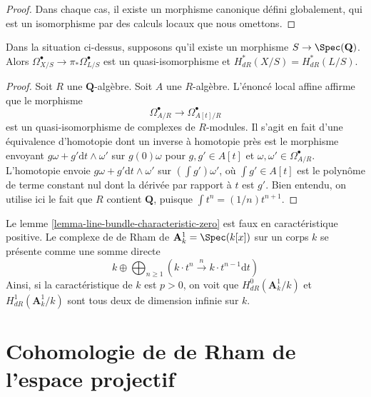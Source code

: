 \begin{proof}
Dans chaque cas, il existe un morphisme canonique défini globalement,
qui est un isomorphisme par des calculs locaux que nous omettons.
\end{proof}

\begin{lemma}
\label{lemma-line-bundle-characteristic-zero}
Dans la situation ci-dessus, supposons qu'il existe un morphisme $S \to \Spec(\mathbf{Q})$.
Alors $\Omega^\bullet_{X/S} \to \pi_*\Omega^\bullet_{L/S}$ est un
quasi-isomorphisme et $H_{dR}^*(X/S) = H_{dR}^*(L/S)$.
\end{lemma}

\begin{proof}
Soit $R$ une $\mathbf{Q}$-algèbre. Soit $A$ une $R$-algèbre.
L'énoncé local affine affirme que le morphisme
$$
\Omega^\bullet_{A/R} \longrightarrow \Omega^\bullet_{A[t]/R}
$$
est un quasi-isomorphisme de complexes de $R$-modules. Il s'agit en fait d'une
équivalence d'homotopie dont un inverse à homotopie près est le morphisme envoyant
$g \omega + g' \text{d}t \wedge \omega'$ sur $g(0)\omega$ pour
$g, g' \in A[t]$ et $\omega, \omega' \in \Omega^\bullet_{A/R}$.
L'homotopie envoie $g \omega + g' \text{d}t \wedge \omega'$
sur $(\int g') \omega'$, où $\int g' \in A[t]$ est le polynôme
de terme constant nul dont la dérivée par rapport à $t$
est $g'$. Bien entendu, on utilise ici le fait que $R$ contient $\mathbf{Q}$,
puisque $\int t^n = (1/n)t^{n + 1}$.
\end{proof}

\begin{example}
\label{example-affine-line}
Le lemme \ref{lemma-line-bundle-characteristic-zero} est
faux en caractéristique positive. Le complexe de de Rham de
$\mathbf{A}^1_k = \Spec(k[x])$ sur un corps $k$ se présente comme une somme directe
$$
k \oplus
\bigoplus\nolimits_{n \geq 1}
(k \cdot t^n \xrightarrow{n}
k \cdot t^{n - 1} \text{d}t)
$$
Ainsi, si la caractéristique de $k$ est $p > 0$,
on voit que $H^0_{dR}(\mathbf{A}^1_k/k)$ et
$H^1_{dR}(\mathbf{A}^1_k/k)$
sont tous deux de dimension infinie sur $k$.
\end{example}








\section{Cohomologie de de Rham de l'espace projectif}
\label{section-projective-space}

